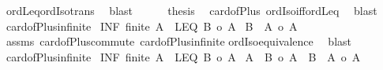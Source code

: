 \begin{isabellebody}
\ ordLeq{\isacharunderscore}{\kern0pt}ordIso{\isacharunderscore}{\kern0pt}trans\ \isamarkupfalse%
\ blast\isanewline
\ \ \ \ \isamarkupfalse%
\ {\isacharquery}{\kern0pt}thesis\ \isamarkupfalse%
\ card{\isacharunderscore}{\kern0pt}of{\isacharunderscore}{\kern0pt}Plus{}\ ordIso{\isacharunderscore}{\kern0pt}iff{\isacharunderscore}{\kern0pt}ordLeq\ \isamarkupfalse%
\ blast\isanewline
\ \ \isamarkupfalse%
\isanewline
{}\isamarkupfalse%
%
\endisatagproof
{\isafoldproof}%
%
\isadelimproof
\isanewline
%
\endisadelimproof
\isanewline
{}\isamarkupfalse%
\ card{\isacharunderscore}{\kern0pt}of{\isacharunderscore}{\kern0pt}Plus{\isacharunderscore}{\kern0pt}infinite{}{\isacharcolon}{\kern0pt}\isanewline
{}\ INF{\isacharcolon}{\kern0pt}\ {\isachardoublequoteopen}{\isasymnot}finite\ A{\isachardoublequoteclose}\ \ LEQ{\isacharcolon}{\kern0pt}\ {\isachardoublequoteopen}{\isacharbar}{\kern0pt}B{\isacharbar}{\kern0pt}\ {\isasymle}o\ {\isacharbar}{\kern0pt}A{\isacharbar}{\kern0pt}{\isachardoublequoteclose}\isanewline
{}\ {\isachardoublequoteopen}{\isacharbar}{\kern0pt}B\ {\isacharless}{\kern0pt}{\isacharplus}{\kern0pt}{\isachargreater}{\kern0pt}\ A{\isacharbar}{\kern0pt}\ {\isacharequal}{\kern0pt}o\ {\isacharbar}{\kern0pt}A{\isacharbar}{\kern0pt}{\isachardoublequoteclose}\isanewline
%
\isadelimproof
%
\endisadelimproof
%
\isatagproof
{}\isamarkupfalse%
\ assms\ card{\isacharunderscore}{\kern0pt}of{\isacharunderscore}{\kern0pt}Plus{\isacharunderscore}{\kern0pt}commute\ card{\isacharunderscore}{\kern0pt}of{\isacharunderscore}{\kern0pt}Plus{\isacharunderscore}{\kern0pt}infinite{}\isanewline
ordIso{\isacharunderscore}{\kern0pt}equivalence\ \isamarkupfalse%
\ blast%
\endisatagproof
{\isafoldproof}%
%
\isadelimproof
\isanewline
%
\endisadelimproof
\isanewline
{}\isamarkupfalse%
\ card{\isacharunderscore}{\kern0pt}of{\isacharunderscore}{\kern0pt}Plus{\isacharunderscore}{\kern0pt}infinite{\isacharcolon}{\kern0pt}\isanewline
{}\ INF{\isacharcolon}{\kern0pt}\ {\isachardoublequoteopen}{\isasymnot}finite\ A{\isachardoublequoteclose}\ \ LEQ{\isacharcolon}{\kern0pt}\ {\isachardoublequoteopen}{\isacharbar}{\kern0pt}B{\isacharbar}{\kern0pt}\ {\isasymle}o\ {\isacharbar}{\kern0pt}A{\isacharbar}{\kern0pt}{\isachardoublequoteclose}\isanewline
{}\ {\isachardoublequoteopen}{\isacharbar}{\kern0pt}A\ {\isacharless}{\kern0pt}{\isacharplus}{\kern0pt}{\isachargreater}{\kern0pt}\ B{\isacharbar}{\kern0pt}\ {\isacharequal}{\kern0pt}o\ {\isacharbar}{\kern0pt}A{\isacharbar}{\kern0pt}\ {\isasymand}\ {\isacharbar}{\kern0pt}B\ {\isacharless}{\kern0pt}{\isacharplus}{\kern0pt}{\isachargreater}{\kern0pt}\ A{\isacharbar}{\kern0pt}\ {\isacharequal}{\kern0pt}o\ {\isacharbar}{\kern0pt}A{\isacharbar}{\kern0pt}{\isachardoublequoteclose}\isanewline

\end{isabellebody}
